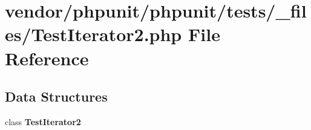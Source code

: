 \section{vendor/phpunit/phpunit/tests/\+\_\+files/\+Test\+Iterator2.php File Reference}
\label{_test_iterator2_8php}
\subsection*{Data Structures}
\begin{DoxyCompactItemize}
\item 
class {\bf Test\+Iterator2}
\end{DoxyCompactItemize}
